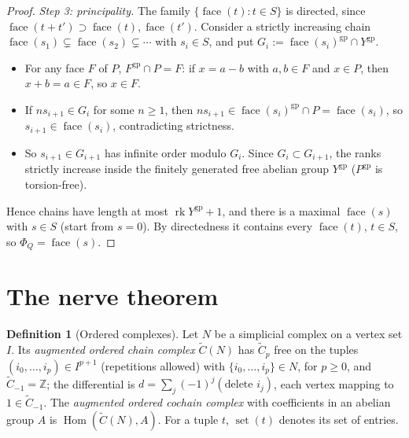 \documentclass[11pt]{article}
\theoremstyle{definition}
\newtheorem{definition}[theorem]{Definition}
\theoremstyle{remark}
\newcommand{\Z}{\mathbb{Z}}
\newcommand{\gp}{\mathrm{gp}}
\newcommand{\face}{\operatorname{face}}
\newcommand{\Hom}{\operatorname{Hom}}
\newcommand{\set}{\operatorname{set}}
\begin{document}
\begin{proof}
\emph{Step 3: principality.} The family $\{\face(t):t\in S\}$ is directed, since $\face(t+t')\supset\face(t),\face(t')$. Consider a strictly increasing chain $\face(s_1)\subsetneq\face(s_2)\subsetneq\cdots$ with $s_i\in S$, and put $G_i:=\face(s_i)^{\gp}\cap Y^{\gp}$.
\begin{itemize}
\item For any face $F$ of $P$, $F^{\gp}\cap P=F$: if $x=a-b$ with $a,b\in F$ and $x\in P$, then $x+b=a\in F$, so $x\in F$.
\item If $ns_{i+1}\in G_i$ for some $n\ge1$, then $ns_{i+1}\in\face(s_i)^{\gp}\cap P=\face(s_i)$, so $s_{i+1}\in\face(s_i)$, contradicting strictness.
\item So $s_{i+1}\in G_{i+1}$ has infinite order modulo $G_i$. Since $G_i\subset G_{i+1}$, the ranks strictly increase inside the finitely generated free abelian group $Y^{\gp}$ ($P^{\gp}$ is torsion-free).
\end{itemize}
Hence chains have length at most $\operatorname{rk}Y^{\gp}+1$, and there is a maximal $\face(s)$ with $s\in S$ (start from $s=0$). By directedness it contains every $\face(t)$, $t\in S$, so $\Phi_Q=\face(s)$.
\end{proof}

\section{The nerve theorem}\label{sec:D}

\begin{definition}[Ordered complexes]
Let $N$ be a simplicial complex on a vertex set $I$. Its \emph{augmented ordered chain complex} $\tilde C(N)$ has $\tilde C_p$ free on the tuples $(i_0,\dots,i_p)\in I^{p+1}$ (repetitions allowed) with $\{i_0,\dots,i_p\}\in N$, for $p\ge0$, and $\tilde C_{-1}=\Z$; the differential is $d=\sum_j(-1)^j(\text{delete }i_j)$, each vertex mapping to $1\in\tilde C_{-1}$. The \emph{augmented ordered cochain complex} with coefficients in an abelian group $A$ is $\Hom(\tilde C(N),A)$. For a tuple $t$, $\set(t)$ denotes its set of entries.
\end{definition}
\end{document}

